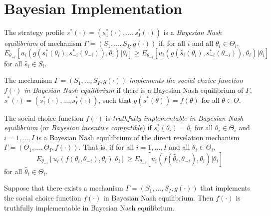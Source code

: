 \section{Bayesian Implementation}

\begin{defn}
    The strategy profile $s^*(\cdot) = (s_1^*(\cdot), \dots, s_I^*(\cdot))$ is a \emph{Bayesian Nash equilibrium} of mechanism $\Gamma = (S_1, \dots, S_I, g(\cdot))$ if, for all $i$ and all $\theta_i \in \Theta_i$,
    \begin{equation*}
        E_{\theta_{-i}} [u_i(g(s^*_i(\theta_i), s^*_{-i}(\theta_{-i})), \theta_i) | \theta_i] \geq E_{\theta_{-i}} [u_i(g(\hat{s}_i(\theta_i), s^*_{-i}(\theta_{-i})), \theta_i) | \theta_i]
    \end{equation*}
    for all $\hat{s}_i \in S_i$.
\end{defn}

\begin{defn}
    The mechanism $\Gamma = (S_1, \dots, S_I, g(\cdot))$ \emph{implements the social choice function $f(\cdot)$ in Bayesian Nash equilibrium} if there is a Bayesian Nash equilibrium of $\Gamma$, $s^*(\cdot) = (s_1^*(\cdot), \dots, s_I^*(\cdot))$, such that $g(s^*(\theta)) = f(\theta)$ for all $\theta \in \Theta$.
\end{defn}

\begin{defn}
    The social choice function $f(\cdot)$ is \emph{truthfully implementable in Bayesian Nash equilibrium} (or \emph{Bayesian incentive compatible}) if $s^*_i(\theta_i) = \theta_i$ for all $\theta_i \in \Theta_i$ and $i = 1, \dots, I$ is a Bayesian Nash equilibrium of the direct revelation mechanism $\Gamma = (\Theta_1, \dots, \Theta_I, f(\cdot))$. That is, if for all $i = 1, \dots, I$ and all $\theta_i \in \Theta_i$,
    \begin{equation*}
        E_{\theta_{-i}} [u_i(f(\theta_i, \theta_{-i}), \theta_i) | \theta_i] \geq E_{\theta_{-i}} [u_i(f(\hat{\theta}_i, \theta_{-i}), \theta_i) | \theta_i]
    \end{equation*}
    for all $\hat{\theta}_i \in \Theta_i$.
\end{defn}

\begin{prop}
    Suppose that there exists a mechanism $\Gamma = (S_1, \dots, S_I, g(\cdot))$ that implements the social choice function $f(\cdot)$ in Bayesian Nash equilibrium. Then $f(\cdot)$ is truthfully implementable in Bayesian Nash equilibrium.
\end{prop}

